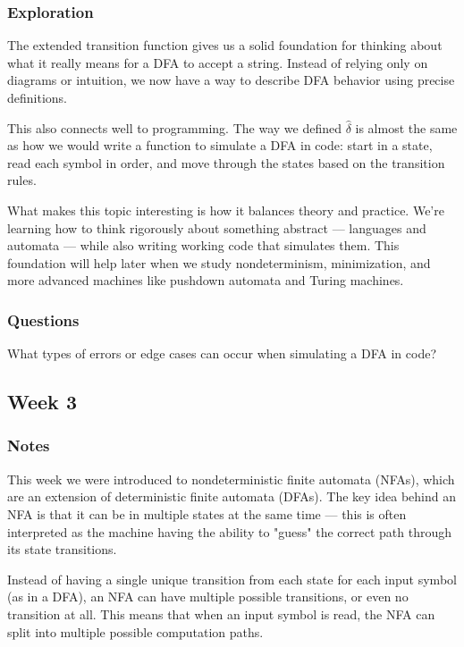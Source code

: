 \documentclass{article}
\theoremstyle{theorem}
\theoremstyle{definition}
\theoremstyle{remark}
\begin{document}
\subsubsection{Exploration}

The extended transition function gives us a solid foundation for thinking about what it really means for a DFA to accept a string. Instead of relying only on diagrams or intuition, we now have a way to describe DFA behavior using precise definitions.

This also connects well to programming. The way we defined $\hat{\delta}$ is almost the same as how we would write a function to simulate a DFA in code: start in a state, read each symbol in order, and move through the states based on the transition rules.

What makes this topic interesting is how it balances theory and practice. We’re learning how to think rigorously about something abstract — languages and automata — while also writing working code that simulates them. This foundation will help later when we study nondeterminism, minimization, and more advanced machines like pushdown automata and Turing machines.

\subsubsection{Questions}

What types of errors or edge cases can occur when simulating a DFA in code?

\subsection{Week 3}

\subsubsection{Notes}

This week we were introduced to nondeterministic finite automata (NFAs), which are an extension of deterministic finite automata (DFAs). The key idea behind an NFA is that it can be in multiple states at the same time — this is often interpreted as the machine having the ability to "guess" the correct path through its state transitions.

Instead of having a single unique transition from each state for each input symbol (as in a DFA), an NFA can have multiple possible transitions, or even no transition at all. This means that when an input symbol is read, the NFA can split into multiple possible computation paths.
\end{document}
